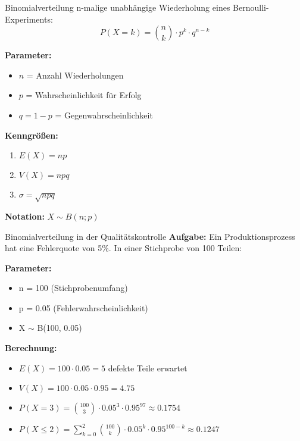 \begin{definition}{Binomialverteilung}
n-malige unabhängige Wiederholung eines Bernoulli-Experiments:
$$P(X=k) = \binom{n}{k} \cdot p^k \cdot q^{n-k}$$

\textbf{Parameter:}
\begin{itemize}
    \item $n$ = Anzahl Wiederholungen
    \item $p$ = Wahrscheinlichkeit für Erfolg
    \item $q = 1-p$ = Gegenwahrscheinlichkeit
\end{itemize}

\textbf{Kenngrößen:}
\begin{enumerate}
    \item $E(X) = np$
    \item $V(X) = npq$
    \item $\sigma = \sqrt{npq}$
\end{enumerate}

\textbf{Notation:} $X \sim B(n;p)$
\end{definition}

\begin{example}{Binomialverteilung in der Qualitätskontrolle}
\textbf{Aufgabe:} Ein Produktionsprozess hat eine Fehlerquote von 5\%. In einer Stichprobe von 100 Teilen:

\textbf{Parameter:}
\begin{itemize}
\item n = 100 (Stichprobenumfang)
\item p = 0.05 (Fehlerwahrscheinlichkeit)
\item X $\sim$  B(100, 0.05)
\end{itemize}

\textbf{Berechnung:}
\begin{itemize}
\item $E(X) = 100 \cdot 0.05 = 5$ defekte Teile erwartet
\item $V(X) = 100 \cdot 0.05 \cdot 0.95 = 4.75$
\item $P(X=3) = \binom{100}{3} \cdot 0.05^3 \cdot 0.95^{97} \approx 0.1754$
\item $P(X \leq 2) = \sum_{k=0}^2 \binom{100}{k} \cdot 0.05^k \cdot 0.95^{100-k} \approx 0.1247$
\end{itemize}
\end{example}

